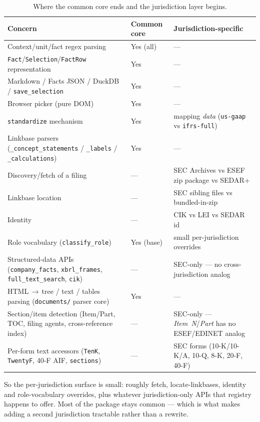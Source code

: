\documentclass[11pt,a4paper]{report}
\begin{document}
\begin{table}[h]
\centering
\caption{Where the common core ends and the jurisdiction layer begins.}
\label{tab:portability}
\small
\begin{tabular}{@{}p{}p{}p{}@{}}
\toprule
\textbf{Concern} & \textbf{Common core} & \textbf{Jurisdiction-specific} \\
\midrule
Context/unit/fact regex parsing & Yes (all) & --- \\
\texttt{Fact}/\texttt{Selection}/\texttt{FactRow} representation & Yes & --- \\
Markdown / Facts JSON / DuckDB / \texttt{save\_selection} & Yes & --- \\
Browser picker (pure DOM) & Yes & --- \\
\texttt{standardize} mechanism & Yes & mapping \emph{data} (\texttt{us-gaap} vs \texttt{ifrs-full}) \\
Linkbase parsers (\texttt{\_concept\_statements} / \texttt{\_labels} / \texttt{\_calculations}) & Yes & --- \\
Discovery/fetch of a filing & --- & SEC Archives vs ESEF zip package vs SEDAR+ \\
Linkbase location & --- & SEC sibling files vs bundled-in-zip \\
Identity & --- & CIK vs LEI vs SEDAR id \\
Role vocabulary (\texttt{classify\_role}) & Yes (base) & small per-jurisdiction overrides \\
Structured-data APIs (\texttt{company\_facts}, \texttt{xbrl\_frames}, \texttt{full\_text\_search}, \texttt{cik}) & --- & SEC-only --- no cross-jurisdiction analog \\
\midrule
HTML\,$\rightarrow$\,tree / text / tables parsing (\texttt{documents/} parser core) & Yes & --- \\
Section/item detection (Item/Part, TOC, filing agents, cross-reference index) & --- & SEC-only --- \emph{Item~N}/\emph{Part} has no ESEF/EDINET analog \\
Per-form text accessors (\texttt{TenK}, \texttt{TwentyF}, 40-F AIF, \texttt{sections}) & --- & SEC forms (10-K/10-K/A, 10-Q, 8-K, 20-F, 40-F) \\
\bottomrule
\end{tabular}
\end{table}

\noindent So the per-jurisdiction surface is small: roughly fetch, locate-linkbases, identity and
role-vocabulary overrides, plus whatever jurisdiction-only APIs that registry happens to offer. Most
of the package stays common --- which is what makes adding a second jurisdiction tractable rather
than a rewrite.
\end{document}
